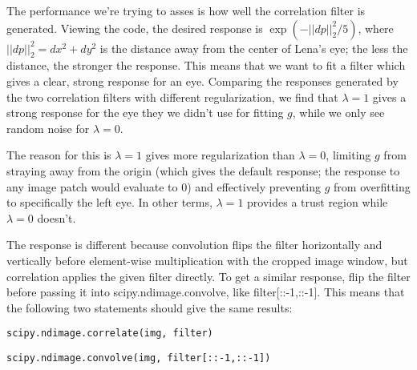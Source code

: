\documentclass{scrbook}
\begin{document}
The performance we’re trying to asses is how well the correlation filter is generated. Viewing the code, the desired response is $\exp (-{\left| \left| dp\right| \right| }_{2}^{2}/5)$, where ${\left| \left| dp\right| \right| }_{2}^{2}=dx^{2}+dy^{2}$ is the distance away from the center of Lena’s eye; the less the distance, the stronger the response. This means that we want to fit a filter which gives a clear, strong response for an eye. Comparing the responses generated by the two correlation filters with different regularization, we find that $\lambda =1$ gives a strong response for the eye they we didn’t use for fitting $g$, while we only see random noise for $\lambda =0$.

The reason for this is $\lambda =1$ gives more regularization than $\lambda =0$, limiting $g$ from straying away from the origin (which gives the default response; the response to any image patch would evaluate to 0) and effectively preventing $g$ from overfitting to specifically the left eye. In other terms, $\lambda =1$ provides a trust region while $\lambda =0$ doesn’t.

The response is different because convolution flips the filter horizontally and vertically before element-wise multiplication with the cropped image window, but correlation applies the given filter directly. To get a similar response, flip the filter before passing it into scipy.ndimage.convolve, like filter{[}::-1,::-1{]}. This means that the following two statements should give the same results:

\texttt{scipy.ndimage.correlate(img, filter)}

\texttt{scipy.ndimage.convolve(img, filter{[}::-1,::-1{]})}
\end{document}
